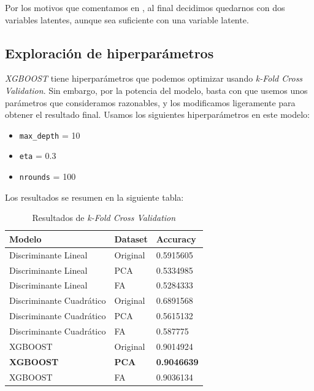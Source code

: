 \documentclass[11pt]{article}
\begin{document}
Por los motivos que comentamos en , al final decidimos quedarnos con dos variables latentes, aunque sea suficiente con una variable latente.

\subsection{Exploración de hiperparámetros}

\textit{XGBOOST} tiene hiperparámetros que podemos optimizar usando \textit{k-Fold Cross Validation}. Sin embargo, por la potencia del modelo, basta con que usemos unos parámetros que consideramos razonables, y los modificamos ligeramente para obtener el resultado final. Usamos los siguientes hiperparámetros en este modelo:

\begin{itemize}
    \item \lstinline{max_depth} = 10
    \item \lstinline{eta} = 0.3
    \item \lstinline{nrounds} = 100
\end{itemize}

Los resultados se resumen en la siguiente tabla:

\begin{table}[H]
\centering
\begin{tabular}{|l|l|l|}
    \hline
    Modelo                   & Dataset      & Accuracy      \\
    \hline
    Discriminante Lineal     & Original     & 0.5915605     \\
    Discriminante Lineal     & PCA          & 0.5334985     \\
    Discriminante Lineal     & FA           & 0.5284333     \\
    Discriminante Cuadrático & Original     & 0.6891568     \\
    Discriminante Cuadrático & PCA          & 0.5615132     \\
    Discriminante Cuadrático & FA           & 0.587775      \\
    XGBOOST                  & Original     & 0.9014924     \\
    \textbf{XGBOOST}         & \textbf{PCA} & \textbf{0.9046639} \\
    XGBOOST                  & FA           & 0.9036134     \\
    \hline

\end{tabular}
\caption{Resultados de \textit{k-Fold Cross Validation}}
\label{table:cross_validation}
\end{table}
\end{document}
